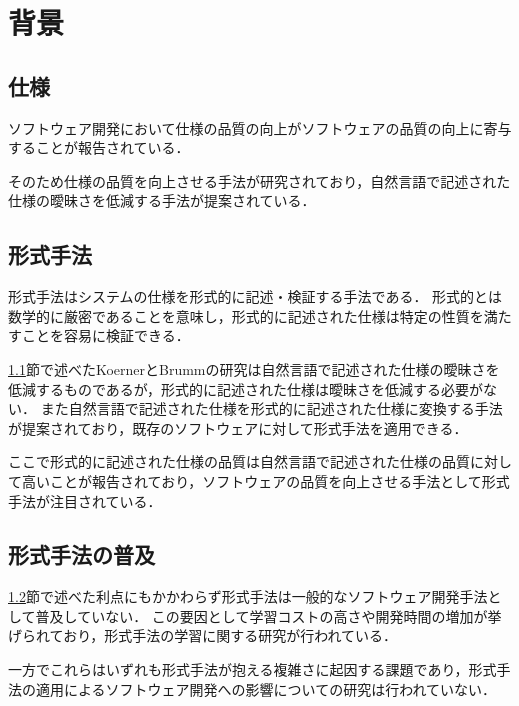 \documentclass[main]{subfiles}
\begin{document}
\chapter{背景}

\section{仕様}
\label{sec:specification}

ソフトウェア開発において仕様の品質の向上がソフトウェアの品質の向上に寄与することが報告されている\cite{knauss:2009}．

そのため仕様の品質を向上させる手法が研究されており，自然言語で記述された仕様の曖昧さを低減する手法が提案されている\cite{koerner:2011}．

\section{形式手法}
\label{sec:formal-method}

形式手法はシステムの仕様を形式的に記述・検証する手法である．
形式的とは数学的に厳密であることを意味し，形式的に記述された仕様は特定の性質を満たすことを容易に検証できる．

\ref{sec:specification}節で述べたKoernerとBrummの研究は自然言語で記述された仕様の曖昧さを低減するものであるが，形式的に記述された仕様は曖昧さを低減する必要がない．
また自然言語で記述された仕様を形式的に記述された仕様に変換する手法が提案されており\cite{ilieva:2005}，既存のソフトウェアに対して形式手法を適用できる．

ここで形式的に記述された仕様の品質は自然言語で記述された仕様の品質に対して高いことが報告されており\cite{fabbrini:2001}，ソフトウェアの品質を向上させる手法として形式手法が注目されている．%

\section{形式手法の普及}

\ref{sec:formal-method}節で述べた利点にもかかわらず形式手法は一般的なソフトウェア開発手法として普及していない．
この要因として学習コストの高さ\cite{kurita:2011}や開発時間の増加\cite{kitamura:2021}が挙げられており，形式手法の学習に関する研究が行われている\cite{ohnishi:2020,araki:2010,araki:2011}．

一方でこれらはいずれも形式手法が抱える複雑さに起因する課題であり，形式手法の適用によるソフトウェア開発への影響についての研究は行われていない．
\end{document}
